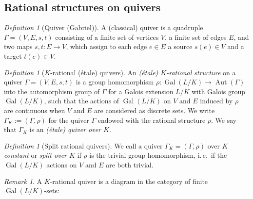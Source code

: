 \documentclass[a4paper,12pt,reqno]{amsart}
\DeclareMathOperator{\Aut}{\mathrm{Aut}}
\DeclareMathOperator{\Gal}{\mathrm {Gal}}
\theoremstyle{plain}
\theoremstyle{remark}
\newtheorem{remark}[theorem]{Remark}
\newtheorem{definition}[theorem]{Definition}
\begin{document}
\subsection{Rational structures on quivers}

\begin{definition}[Quiver (Gabriel)]
  A (classical) quiver is a quadruple $\Gamma=(V,E,s,t)$ consisting of a finite set of vertices $V$, a finite set of edges $E$, and two maps $s,t\colon E\to V$, which assign to each edge $e\in E$ a source $s(e)\in V$ and a target $t(e)\in V$.
\end{definition}

\begin{definition}[$K$-rational (\'etale) quivers]\label{def:rationalquivers}
  An {\em (\'etale) $K$-rational structure} on a quiver $\Gamma=(V,E,s,t)$ is a group homomorphism $\rho\colon\Gal(L/K)\to\Aut(\Gamma)$ into the automorphism group of $\Gamma$ for a Galois extension $L/K$ with Galois group $\Gal(L/K)$, such that the actions of $\Gal(L/K)$ on $V$ and $E$ induced by $\rho$ are continuous when $V$ and $E$ are considered as discrete sets. We write $\Gamma_K:=(\Gamma,\rho)$ for the quiver $\Gamma$ endowed with the rational structure $\rho$. We say that $\Gamma_K$ is an {\em (\'etale) quiver over $K$}.
\end{definition}

\begin{definition}[Split rational quivers]\label{def:splitrationalquivers}
  We call a quiver $\Gamma_K=(\Gamma,\rho)$ over $K$ {\em constant} or {\em split over $K$} if $\rho$ is the trivial group homomorphism, i.\,e.\ if the $\Gal(L/K)$ actions on $V$ and $E$ are both trivial.
\end{definition}

\begin{remark}
A $K$-rational quiver is a diagram in the category of finite $\Gal(L/K)$-sets:
   \begin{center}
   \end{center}
\end{remark}
\end{document}
